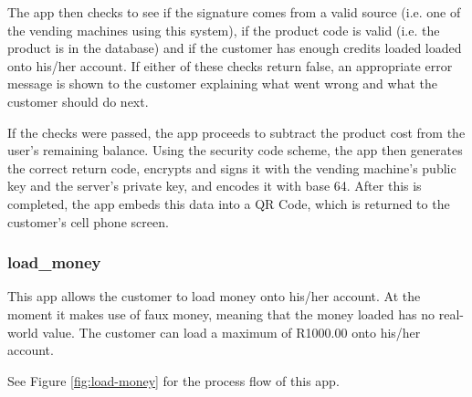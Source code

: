 The app then checks to see if the signature comes from a valid source (i.e. one of the vending
machines using this system), if the product code is valid (i.e. the product is in the database)
and if the customer has enough credits loaded loaded onto his/her account. If either of these
checks return false, an appropriate error message is shown to the customer explaining what
went wrong and what the customer should do next.

If the checks were passed, the app proceeds to subtract the product cost from the user's
remaining balance. Using the security code scheme, the app then generates the correct return
code, encrypts and signs it with the vending machine's public key and the server's private key,
and encodes it with base 64. After this is completed, the app embeds this data into a QR Code,
which is returned to the customer's cell phone screen. 

\subsubsection{load\_money}

This app allows the customer to load money onto his/her account. At the moment it makes use of
faux money, meaning that the money loaded has no real-world value. The customer can load a
maximum of R1000.00 onto his/her account.

See Figure \ref{fig:load-money} for the process flow of this
app.

